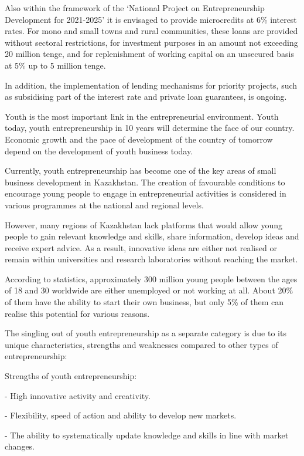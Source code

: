Also within the framework of the `National Project on Entrepreneurship
Development for 2021-2025' it is envisaged to provide microcredits at
6\% interest rates. For mono and small towns and rural communities,
these loans are provided without sectoral restrictions, for investment
purposes in an amount not exceeding 20 million tenge, and for
replenishment of working capital on an unsecured basis at 5\% up to 5
million tenge.

In addition, the implementation of lending mechanisms for priority
projects, such as subsidising part of the interest rate and private loan
guarantees, is ongoing.

Youth is the most important link in the entrepreneurial environment.
Youth today, youth entrepreneurship in 10 years will determine the face
of our country. Economic growth and the pace of development of the
country of tomorrow depend on the development of youth business today.

Currently, youth entrepreneurship has become one of the key areas of
small business development in Kazakhstan. The creation of favourable
conditions to encourage young people to engage in entrepreneurial
activities is considered in various programmes at the national and
regional levels.

However, many regions of Kazakhstan lack platforms that would allow
young people to gain relevant knowledge and skills, share information,
develop ideas and receive expert advice. As a result, innovative ideas
are either not realised or remain within universities and research
laboratories without reaching the market.

According to statistics, approximately 300 million young people between
the ages of 18 and 30 worldwide are either unemployed or not working at
all. About 20\% of them have the ability to start their own business,
but only 5\% of them can realise this potential for various reasons.

The singling out of youth entrepreneurship as a separate category is due
to its unique characteristics, strengths and weaknesses compared to
other types of entrepreneurship:

Strengths of youth entrepreneurship:

- High innovative activity and creativity.

- Flexibility, speed of action and ability to develop new markets.

- The ability to systematically update knowledge and skills in line with
market changes.


